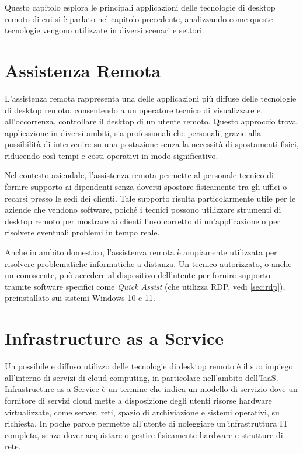 \documentclass[12pt,a4paper,openright,twoside]{book}
\begin{document}
Questo capitolo esplora le principali applicazioni delle tecnologie di desktop remoto di cui si è parlato nel capitolo precedente, analizzando come queste tecnologie vengono utilizzate in diversi scenari e settori.

\section{Assistenza Remota}
\label{sec:remote-assistance}

L'assistenza remota rappresenta una delle applicazioni più diffuse delle tecnologie di desktop remoto, consentendo a un operatore tecnico di visualizzare e, all'occorrenza, controllare il desktop di un utente remoto. Questo approccio trova applicazione in diversi ambiti, sia professionali che personali, grazie alla possibilità di intervenire su una postazione senza la necessità di spostamenti fisici, riducendo così tempi e costi operativi in modo significativo.

Nel contesto aziendale, l'assistenza remota permette al personale tecnico di fornire supporto ai dipendenti senza doversi spostare fisicamente tra gli uffici o recarsi presso le sedi dei clienti. Tale supporto risulta particolarmente utile per le aziende che vendono software, poiché i tecnici possono utilizzare strumenti di desktop remoto per mostrare ai clienti l'uso corretto di un'applicazione o per risolvere eventuali problemi in tempo reale. 

Anche in ambito domestico, l'assistenza remota è ampiamente utilizzata per risolvere problematiche informatiche a distanza. Un tecnico autorizzato, o anche un conoscente, può accedere al dispositivo dell’utente per fornire supporto tramite software specifici come \textit{Quick Assist} (che utilizza RDP, vedi \ref{sec:rdp}), preinstallato sui sistemi Windows 10 e 11.



\section{Infrastructure as a Service}
\label{sec:iaas}
Un possibile e diffuso utilizzo delle tecnologie di desktop remoto è il suo impiego all'interno di servizi di cloud computing, in particolare nell'ambito dell'\ac{IaaS}.
Infrastructure as a Service è un termine che indica un modello di servizio dove un fornitore di servizi cloud mette a disposizione degli utenti risorse hardware virtualizzate, come server, reti, spazio di archiviazione e sistemi operativi, su richiesta. In poche parole permette all'utente di noleggiare un'infrastruttura IT completa, senza dover acquistare o gestire fisicamente hardware e strutture di rete.
\end{document}
